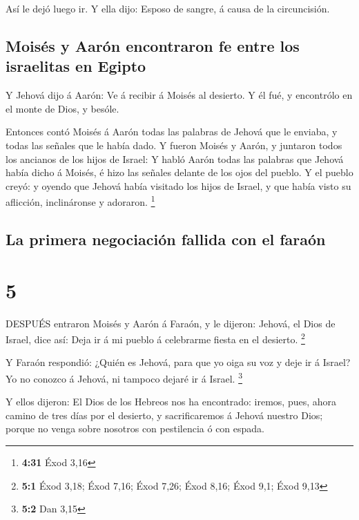  Así le dejó luego ir. Y ella dijo: Esposo de sangre, á
causa de la circuncisión.

\hypertarget{moisuxe9s-y-aaruxf3n-encontraron-fe-entre-los-israelitas-en-egipto}{%
\subsection{Moisés y Aarón encontraron fe entre los israelitas en
Egipto}\label{moisuxe9s-y-aaruxf3n-encontraron-fe-entre-los-israelitas-en-egipto}}

 Y Jehová dijo á Aarón: Ve á recibir á Moisés al desierto.
Y él fué, y encontrólo en el monte de Dios, y besóle.

 Entonces contó Moisés á Aarón todas las palabras de Jehová
que le enviaba, y todas las señales que le había dado.  Y
fueron Moisés y Aarón, y juntaron todos los ancianos de los hijos de
Israel:  Y habló Aarón todas las palabras que Jehová había
dicho á Moisés, é hizo las señales delante de los ojos del pueblo.
 Y el pueblo creyó: y oyendo que Jehová había visitado los
hijos de Israel, y que había visto su aflicción, inclináronse y
adoraron. \footnote{\textbf{4:31} Éxod 3,16}

\hypertarget{la-primera-negociaciuxf3n-fallida-con-el-farauxf3n}{%
\subsection{La primera negociación fallida con el
faraón}\label{la-primera-negociaciuxf3n-fallida-con-el-farauxf3n}}

\hypertarget{section-4}{%
\section{5}\label{section-4}}

 DESPUÉS entraron Moisés y Aarón á Faraón, y le dijeron:
Jehová, el Dios de Israel, dice así: Deja ir á mi pueblo á celebrarme
fiesta en el desierto. \footnote{\textbf{5:1} Éxod 3,18; Éxod 7,16; Éxod
  7,26; Éxod 8,16; Éxod 9,1; Éxod 9,13}

 Y Faraón respondió: ¿Quién es Jehová, para que yo oiga su
voz y deje ir á Israel? Yo no conozco á Jehová, ni tampoco dejaré ir á
Israel. \footnote{\textbf{5:2} Dan 3,15}

 Y ellos dijeron: El Dios de los Hebreos nos ha encontrado:
iremos, pues, ahora camino de tres días por el desierto, y
sacrificaremos á Jehová nuestro Dios; porque no venga sobre nosotros con
pestilencia ó con espada.


